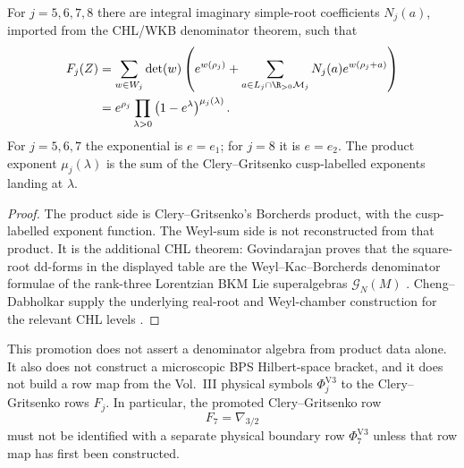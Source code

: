 \begin{theorem}
For $j=5,6,7,8$ there are integral imaginary simple-root coefficients
$N_j(a)$, imported from the CHL/WKB denominator theorem, such that
$$
\begin{aligned}
F_j(Z)
&=\sum_{w\in W_j}\det(w)
\left(
e^{w(\rho_j)}
+\sum_{a\in L_j\cap\R_{>0}\mathcal M_j}
N_j(a)e^{w(\rho_j+a)}
\right)\\
&=e^{\rho_j}
\prod_{\lambda>0}
\left(1-e^\lambda\right)^{\mu_j(\lambda)}.
\end{aligned}
$$
For $j=5,6,7$ the exponential is $e=e_1$; for $j=8$ it is $e=e_2$.
The product exponent $\mu_j(\lambda)$ is the sum of the
Clery--Gritsenko cusp-labelled exponents landing at $\lambda$.
\end{theorem}

\begin{proof}
The product side is Clery--Gritsenko's Borcherds product, with the
cusp-labelled exponent function.  The Weyl-sum side is not reconstructed
from that product.  It is the additional CHL theorem:
Govindarajan proves that the square-root dd-forms in the displayed
table are the Weyl--Kac--Borcherds denominator formulae of the
rank-three Lorentzian BKM Lie superalgebras $\mathcal G_N(M)$
\cite{Gov11BKM}.  Cheng--Dabholkar supply the underlying real-root and
Weyl-chamber construction for the relevant CHL levels \cite{CD09BKM}.
\end{proof}

\begin{remark}
This promotion does not assert a denominator algebra from product data
alone.  It also does not construct a microscopic BPS Hilbert-space
bracket, and it does not build a row map from the Vol.~III physical
symbols $\Phi^{\mathrm{V3}}_j$ to the Clery--Gritsenko rows $F_j$.  In particular,
the promoted Clery--Gritsenko row
$$
F_7=\nabla_{3/2}
$$
must not be identified with a separate physical boundary row
$\Phi^{\mathrm{V3}}_7$ unless that row map has first been constructed.
\end{remark}
